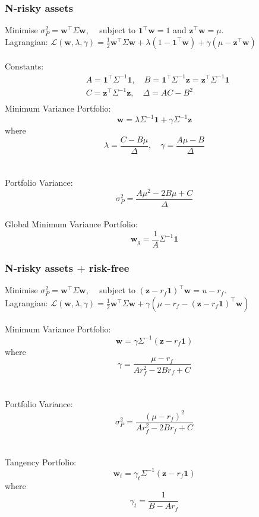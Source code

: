 \documentclass[11pt]{article}
\begin{document}
	\subsubsection{N-risky assets}
	Minimise \( \displaystyle\sigma_P^2 = \bm{w}^{\top} \Sigma \bm{w} \), \( \quad \)subject to \( \bm{1}^{\top}\bm{w}= 1 \) and \( \bm{z}^{\top}\bm{w}=\mu \).\\[5pt]
	Lagrangian: \( \mathcal{L}(\bm{w}, \lambda, \gamma)  = \frac{1}{2} \bm{w}^{\top} \Sigma \bm{w} + \lambda (1 - \bm{1}^{\top}\bm{w}) + \gamma (\mu - \bm{z}^{\top}\bm{w})\)\\\\
	Constants: \begin{align*}
				&	A = \bm{1}^{\top}\Sigma^{-1}\bm{1},\quad B =  \bm{1}^{\top}\Sigma^{-1}\bm{z} = \bm{z}^{\top}\Sigma^{-1}\bm{1}\\[2pt]
				&	C = \bm{z}^{\top}\Sigma^{-1}\bm{z}, \quad\Delta = AC - B^2\\
				\end{align*} 
	Minimum Variance Portfolio: 
	\[ \displaystyle\bm{w} = \lambda \Sigma^{-1} \bm{1} + \gamma \Sigma^{-1}\bm{z}  \]where \[ \lambda = \frac{C - B\mu}{\Delta}, \quad\gamma = \frac{A \mu- B}{\Delta} \]\\\\
	Portfolio Variance: \[ \sigma_P^2 = \frac{A\mu^2 -2B\mu + C}{\Delta} \]\\
	Global Minimum Variance Portfolio: \[ \bm{w}_g = \frac{1}{A}\Sigma^{-1}\bm{1} \]
	
	\subsubsection{N-risky assets + risk-free}
	Minimise \( \sigma_P^2 = \bm{w}^{\top} \Sigma \bm{w} \), \( \quad \)subject to \( (\bm{z} - r_{f}\bm{1})^{\top}\bm{w} = u - r_f \).\\[5pt]
	Lagrangian: \( \mathcal{L}(\bm{w}, \lambda, \gamma)  = \frac{1}{2}\bm{w}^{\top}\Sigma\bm{w} + \gamma(\mu - r_f - (\bm{z} - r_f \bm{1})^{\top}\bm{w}) \)\\\\
	Minimum Variance Portfolio: \[ \bm{w} = \gamma\Sigma^{-1}(\bm{z} - r_f \bm{1}) \] where \[ \gamma = \frac{\mu - r_f}{A r_f^2 -2B r_f + C} \]\\\\
	Portfolio Variance: \[ \sigma_P^2 = \frac{(\mu - r_f)^2}{A r_f^2 -2B r_f + C} \]\\\\
	Tangency Portfolio: \[ \bm{w}_t = \gamma_t \Sigma^{-1}(\bm{z} - r_f \bm{1}) \] where \[ \gamma_t = \frac{1}{B - Ar_f} \]
	\newpage
\end{document}
